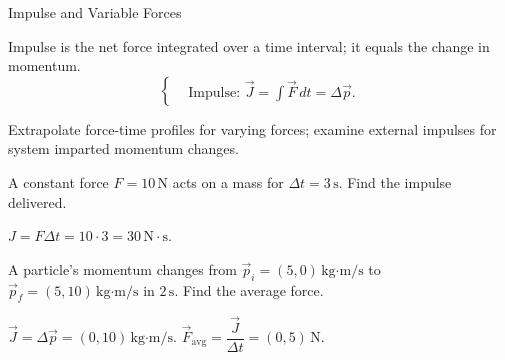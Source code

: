 \begin{KnowledgePoint}{Impulse and Variable Forces \Extension}
  \KPFormulas
\begin{formulabox}
  Impulse is the net force integrated over a time interval; it equals the change in momentum.
  \[
  \left\{\begin{aligned}
    &\text{Impulse: } \vec J=\int \vec F\,dt=\Delta \vec p.
  \end{aligned}\right.
  \]
\end{formulabox}

  \KPHeuristics
  \begin{heuristicsbox}
  Extrapolate force-time profiles for varying forces; examine external impulses for system imparted momentum changes.
  \end{heuristicsbox}

  \KPProblems
\begin{cheatproblem}
  A constant force $F=10\,\text{N}$ acts on a mass for $\Delta t=3\,\text{s}$. Find the impulse delivered.
\begin{solutionbox}
  $J=F\Delta t=10\cdot3=30\,\text{N}\cdot\text{s}$.
\end{solutionbox}
\end{cheatproblem}
\begin{cheatproblem}
  A particle's momentum changes from $\vec p_i=(5,0)\,\text{kg·m/s}$ to $\vec p_f=(5,10)\,\text{kg·m/s}$ in $2\,\text{s}$. Find the average force.
\begin{solutionbox}
  $\vec J=\Delta\vec p=(0,10)\,\text{kg·m/s}$. $\vec F_{\text{avg}}=\dfrac{\vec J}{\Delta t}=(0,5)\,\text{N}$.
\end{solutionbox}
\end{cheatproblem}
\end{KnowledgePoint}

